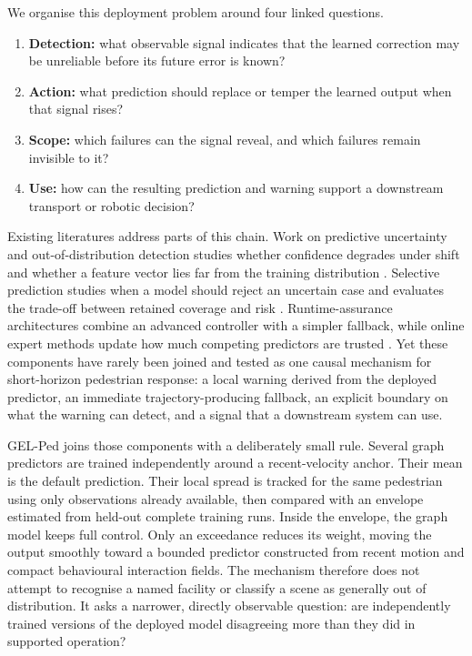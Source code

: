 We organise this deployment problem around four linked questions.

\begin{enumerate}
    \item \textbf{Detection:} what observable signal indicates that the learned correction may be unreliable before its future error is known?
    \item \textbf{Action:} what prediction should replace or temper the learned output when that signal rises?
    \item \textbf{Scope:} which failures can the signal reveal, and which failures remain invisible to it?
    \item \textbf{Use:} how can the resulting prediction and warning support a downstream transport or robotic decision?
\end{enumerate}

Existing literatures address parts of this chain. Work on predictive uncertainty and out-of-distribution detection studies whether confidence degrades under shift and whether a feature vector lies far from the training distribution \citep{ovadia2019uncertainty,lee2018mahalanobis,malinin2021shifts}. Selective prediction studies when a model should reject an uncertain case and evaluates the trade-off between retained coverage and risk \citep{geifman2017selective,cortes2016rejection}. Runtime-assurance architectures combine an advanced controller with a simpler fallback, while online expert methods update how much competing predictors are trusted \citep{sha2001simplicity,herbster1998tracking,cesabianchi2006prediction}. Yet these components have rarely been joined and tested as one causal mechanism for short-horizon pedestrian response: a local warning derived from the deployed predictor, an immediate trajectory-producing fallback, an explicit boundary on what the warning can detect, and a signal that a downstream system can use.

GEL-Ped joins those components with a deliberately small rule. Several graph predictors are trained independently around a recent-velocity anchor. Their mean is the default prediction. Their local spread is tracked for the same pedestrian using only observations already available, then compared with an envelope estimated from held-out complete training runs. Inside the envelope, the graph model keeps full control. Only an exceedance reduces its weight, moving the output smoothly toward a bounded predictor constructed from recent motion and compact behavioural interaction fields. The mechanism therefore does not attempt to recognise a named facility or classify a scene as generally out of distribution. It asks a narrower, directly observable question: are independently trained versions of the deployed model disagreeing more than they did in supported operation?

